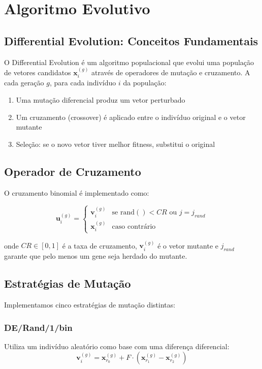 \documentclass[runningheads]{llncs}
\begin{document}
\section{Algoritmo Evolutivo}

\subsection{Differential Evolution: Conceitos Fundamentais}

O Differential Evolution é um algoritmo populacional que evolui uma população de vetores candidatos $\mathbf{x}^{(g)}_i$ através de operadores de mutação e cruzamento. A cada geração $g$, para cada indivíduo $i$ da população:

\begin{enumerate}
    \item Uma mutação diferencial produz um vetor perturbado
    \item Um cruzamento (crossover) é aplicado entre o indivíduo original e o vetor mutante
    \item Seleção: se o novo vetor tiver melhor fitness, substitui o original
\end{enumerate}

\subsection{Operador de Cruzamento}

O cruzamento binomial é implementado como:

\begin{equation}
\mathbf{u}_i^{(g)} = \begin{cases}
\mathbf{v}_i^{(g)} & \text{se } \text{rand}() < CR \text{ ou } j = j_{rand} \\
\mathbf{x}_i^{(g)} & \text{caso contrário}
\end{cases}
\end{equation}

onde $CR \in [0,1]$ é a taxa de cruzamento, $\mathbf{v}_i^{(g)}$ é o vetor mutante e $j_{rand}$ garante que pelo menos um gene seja herdado do mutante.

\subsection{Estratégias de Mutação}

Implementamos cinco estratégias de mutação distintas:

\subsubsection{DE/Rand/1/bin}
Utiliza um indivíduo aleatório como base com uma diferença diferencial:
\begin{equation}
\mathbf{v}_i^{(g)} = \mathbf{x}_{r_0}^{(g)} + F \cdot (\mathbf{x}_{r_1}^{(g)} - \mathbf{x}_{r_2}^{(g)})
\end{equation}
\end{document}
